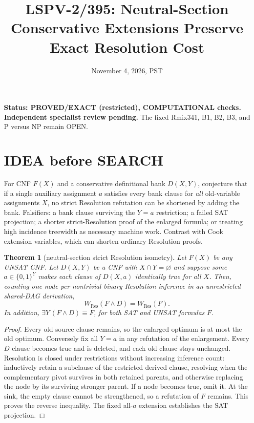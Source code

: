 \documentclass{article}
\title{LSPV-2/395: Neutral-Section Conservative Extensions Preserve Exact Resolution Cost}
\date{November 4, 2026, PST}
\newtheorem{theorem}{Theorem}
\begin{document}
\maketitle
\noindent\textbf{Status: PROVED/EXACT (restricted), COMPUTATIONAL checks. Independent specialist review pending.} The fixed Rmix341, B1, B2, B3, and P versus NP remain OPEN.

\section*{IDEA before SEARCH}
For CNF $F(X)$ and a conservative definitional bank $D(X,Y)$, conjecture that if a single auxiliary assignment $a$ satisfies every bank clause for \emph{all} old-variable assignments $X$, no strict Resolution refutation can be shortened by adding the bank. Falsifiers: a bank clause surviving the $Y=a$ restriction; a failed SAT projection; a shorter strict-Resolution proof of the enlarged formula; or treating high incidence treewidth as necessary machine work. Contrast with Cook extension variables, which can shorten ordinary Resolution proofs.

\begin{theorem}[neutral-section strict Resolution isometry]
Let $F(X)$ be any UNSAT CNF. Let $D(X,Y)$ be a CNF with $X\cap Y=\varnothing$ and suppose some $a\in\{0,1\}^Y$ makes each clause of $D(X,a)$ identically true for all $X$. Then, counting one node per nontrivial binary Resolution inference in an unrestricted shared-DAG derivation,
\[
W_{\mathrm{Res}}(F\wedge D)=W_{\mathrm{Res}}(F).
\]
In addition, $\exists Y\,(F\wedge D)\equiv F$, for \emph{both} SAT and UNSAT formulas $F$.
\end{theorem}
\begin{proof}
Every old source clause remains, so the enlarged optimum is at most the old optimum. Conversely fix all $Y=a$ in any refutation of the enlargement. Every $D$-clause becomes true and is deleted, and each old clause stays unchanged. Resolution is closed under restrictions without increasing inference count: inductively retain a subclause of the restricted derived clause, resolving when the complementary pivot survives in both retained parents, and otherwise replacing the node by its surviving stronger parent. If a node becomes true, omit it. At the sink, the empty clause cannot be strengthened, so a refutation of $F$ remains. This proves the reverse inequality. The fixed all-$a$ extension establishes the SAT projection.
\end{proof}
\end{document}
